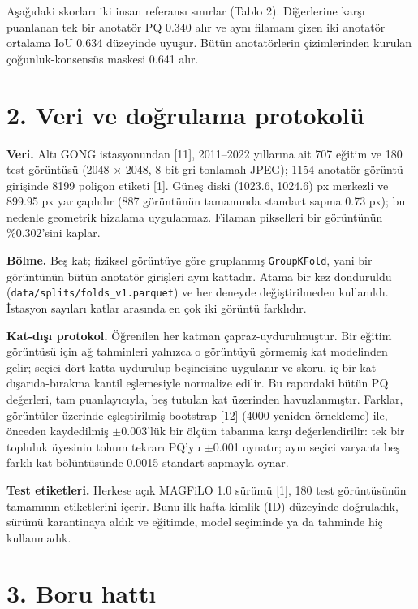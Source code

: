 Aşağıdaki skorları iki insan referansı sınırlar (Tablo 2). Diğerlerine karşı puanlanan tek bir
anotatör PQ 0.340 alır ve aynı filamanı çizen iki anotatör ortalama IoU 0.634 düzeyinde uyuşur.
Bütün anotatörlerin çizimlerinden kurulan çoğunluk-konsensüs maskesi 0.641 alır.

\section{2. Veri ve doğrulama protokolü}\label{veri-ve-doux11frulama-protokoluxfc}

\textbf{Veri.} Altı GONG istasyonundan {[}11{]}, 2011--2022 yıllarına ait 707 eğitim ve 180 test görüntüsü
(2048 $\times$ 2048, 8 bit gri tonlamalı JPEG); 1154 anotatör-görüntü girişinde 8199 poligon etiketi {[}1{]}.
Güneş diski (1023.6, 1024.6) px merkezli ve 899.95 px yarıçaplıdır (887 görüntünün tamamında
standart sapma 0.73 px); bu nedenle geometrik hizalama uygulanmaz. Filaman pikselleri bir
görüntünün \%0.302'sini kaplar.

\textbf{Bölme.} Beş kat; fiziksel görüntüye göre gruplanmış \texttt{GroupKFold}, yani bir görüntünün bütün
anotatör girişleri aynı kattadır. Atama bir kez donduruldu (\texttt{data/splits/folds\_v1.parquet}) ve
her deneyde değiştirilmeden kullanıldı. İstasyon sayıları katlar arasında en çok iki görüntü
farklıdır.

\textbf{Kat-dışı protokol.} Öğrenilen her katman çapraz-uydurulmuştur. Bir eğitim görüntüsü için ağ
tahminleri yalnızca o görüntüyü görmemiş kat modelinden gelir; seçici dört katta uydurulup
beşincisine uygulanır ve skoru, iç bir kat-dışarıda-bırakma kantil eşlemesiyle normalize edilir.
Bu rapordaki bütün PQ değerleri, tam puanlayıcıyla, beş tutulan kat üzerinden havuzlanmıştır.
Farklar, görüntüler üzerinde eşleştirilmiş bootstrap {[}12{]} (4000 yeniden örnekleme) ile, önceden
kaydedilmiş $\pm$0.003'lük bir ölçüm tabanına karşı değerlendirilir: tek bir topluluk üyesinin tohum
tekrarı PQ'yu $\pm$0.001 oynatır; aynı seçici varyantı beş farklı kat bölüntüsünde 0.0015 standart
sapmayla oynar.

\textbf{Test etiketleri.} Herkese açık MAGFiLO 1.0 sürümü {[}1{]}, 180 test görüntüsünün tamamının
etiketlerini içerir. Bunu ilk hafta kimlik (ID) düzeyinde doğruladık, sürümü karantinaya aldık ve
eğitimde, model seçiminde ya da tahminde hiç kullanmadık.

\section{3. Boru hattı}\label{boru-hattux131}

